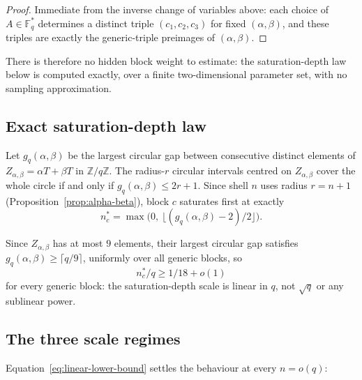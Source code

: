     \begin{proof}
      Immediate from the inverse change of variables above: each choice of $A\in\mathbb{F}_q^*$
      determines a distinct triple $(c_1,c_2,c_3)$ for fixed $(\alpha,\beta)$, and these
      triples are exactly the generic-triple preimages of $(\alpha,\beta)$.
    \end{proof}

    There is therefore no hidden block weight to estimate: the saturation-depth law below is
    computed exactly, over a finite two-dimensional parameter set, with no sampling
    approximation.

  \subsection{Exact saturation-depth law}

    \begin{proposition}
      \label{prop:saturation}
      Let $g_q(\alpha,\beta)$ be the largest circular gap between consecutive distinct
      elements of $Z_{\alpha,\beta}=\alpha T+\beta T$ in $\mathbb{Z}/q\mathbb{Z}$.
      The radius-$r$ circular intervals centred on $Z_{\alpha,\beta}$ cover the whole circle
      if and only if $g_q(\alpha,\beta)\leq 2r+1$.
      Since shell $n$ uses radius $r=n+1$ (Proposition~\ref{prop:alpha-beta}), block $c$
      saturates first at exactly
      \begin{equation}
        n_c^* = \max\bigl(0,\ \lfloor (g_q(\alpha,\beta)-2)/2 \rfloor\bigr).
        \label{eq:nstar}
      \end{equation}
    \end{proposition}

    Since $Z_{\alpha,\beta}$ has at most $9$ elements, their largest circular gap satisfies
    $g_q(\alpha,\beta)\geq\lceil q/9\rceil$, uniformly over all generic blocks, so
    \begin{equation}
      n_c^*/q \geq 1/18 + o(1)
      \label{eq:linear-lower-bound}
    \end{equation}
    for every generic block: the saturation-depth scale is linear in $q$, not
    $\sqrt{q}$ or any sublinear power.

  \subsection{The three scale regimes}
    \label{sec:three-regimes}

    Equation~\eqref{eq:linear-lower-bound} settles the behaviour at every $n=o(q)$:

